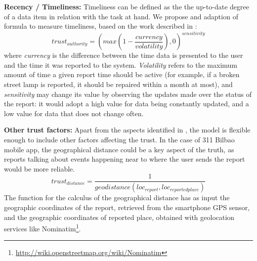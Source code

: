 \textbf{Recency / Timeliness:} Timeliness can be defined as the the up-to-date degree of a data item in relation with the task at hand. We propose and adaption of \cite{Hartig09usingweb} formula to measure timeliness, based on the work described in \cite{Ballou:1998:MIM:291329.291335}:
%
\begin{equation}
    trust_{authority} = (max(1-\frac{currency}{volatility}), 0)^{sensitivity}
\end{equation}
%
where \emph{currency} is the difference between the time data is presented to the user and the time it was reported to the system. \emph{Volatility} refers to the maximum amount of time a given report time should be active (for example, if a broken street lamp is reported, it should be repaired within a month at most), and \emph{sensitivity} may change its value by observing the updates made over the status of the report: it would adopt a high value for data being constantly updated, and a low value for data that does not change often.

\textbf{Other trust factors:} Apart from the aspects identified in \cite{gil2007towards}, the model is flexible enough to include other factors affecting the trust. In the case of 311 Bilbao mobile app, the geographical distance could be a key aspect of the truth, as reports talking about events happening near to where the user sends the report would be more reliable.
%
\begin{equation}
trust_{distance} = \frac{1}{geodistance(loc_{report}, loc_{reportedplace})}
\end{equation}
%
The function for the calculus of the geographical distance has as input the geographic coordinates of the report, retrieved from the smartphone GPS sensor, and the geographic coordinates of reported place, obtained with geolocation services like Nominatim\footnote{\url{http://wiki.openstreetmap.org/wiki/Nominatim}}.